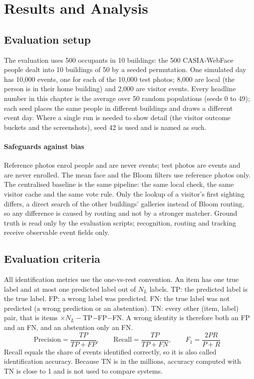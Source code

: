 \documentclass[12pt,a4paper,oneside]{report}
\begin{document}
\clearpage
\chapter{Results and Analysis}
\label{ch:results}
\section{Evaluation setup}
The evaluation uses 500 occupants in 10 buildings: the 500 CASIA-WebFace people dealt into 10 buildings of 50 by a seeded permutation. One simulated day has 10,000 events, one for each of the 10,000 test photos; 8,000 are local (the person is in their home building) and 2,000 are visitor events. Every headline number in this chapter is the average over 50 random populations (seeds 0 to 49); each seed places the same people in different buildings and draws a different event day. Where a single run is needed to show detail (the visitor outcome buckets and the screenshots), seed 42 is used and is named as such.

\subsubsection{Safeguards against bias}
Reference photos enrol people and are never events; test photos are events and are never enrolled. The mean face and the Bloom filters use reference photos only. The centralised baseline is the same pipeline: the same local check, the same visitor cache and the same vote rule. Only the lookup of a visitor's first sighting differs, a direct search of the other buildings' galleries instead of Bloom routing, so any difference is caused by routing and not by a stronger matcher. Ground truth is read only by the evaluation scripts; recognition, routing and tracking receive observable event fields only.

\section{Evaluation criteria}
All identification metrics use the one-vs-rest convention. An item has one true label and at most one predicted label out of $N_L$ labels. TP: the predicted label is the true label. FP: a wrong label was predicted. FN: the true label was not predicted (a wrong prediction or an abstention). TN: every other (item, label) pair, that is items $\times N_L-$TP$-$FP$-$FN. A wrong identity is therefore both an FP and an FN, and an abstention only an FN.
\begin{equation}\label{eq:metrics}
\mathrm{Precision}=\frac{TP}{TP+FP},\qquad \mathrm{Recall}=\frac{TP}{TP+FN},\qquad F_1=\frac{2PR}{P+R}
\end{equation}
Recall equals the share of events identified correctly, so it is also called identification accuracy. Because TN is in the millions, accuracy computed with TN is close to 1 and is not used to compare systems.
\end{document}
